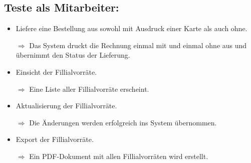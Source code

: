 \documentclass[a4paper]{report}
\begin{document}
\subsection*{Teste als Mitarbeiter:}
\begin{itemize}
 \item Liefere eine Bestellung aus sowohl mit Ausdruck einer Karte als auch ohne.
 \item[$\Rightarrow$] Das System druckt die Rechnung einmal mit und einmal ohne aus und übernimmt den Status der Lieferung. 
 \item Einsicht der Fillialvorräte.
 \item[$\Rightarrow$] Eine Liste aller Fillialvorräte erscheint.
 \item Aktualisierung der Fillialvorräte.
 \item[$\Rightarrow$] Die Änderungen werden erfolgreich ins System übernommen.
 \item Export der Fillialvorräte.
 \item[$\Rightarrow$] Ein PDF-Dokument mit allen Fillialvorräten wird erstellt.
\end{itemize}
\end{document}
